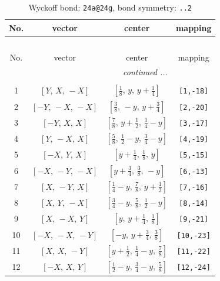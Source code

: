 \documentclass[fleqn,8pt]{jsarticle}
\begin{document}
\begin{longtable}{cccc}
\caption{Wyckoff bond: {\tt 24a@24g}, bond symmetry: {\tt ..2}}
 \\
 \hline \hline
No. & vector & center & mapping \\ \hline \endfirsthead

\multicolumn{3}{l}{\tablename\ \thetable{}} \\
 \hline \hline
No. & vector & center & mapping \\ \hline \endhead

 \hline \hline
\multicolumn{3}{r}{\footnotesize\it continued ...} \\ \endfoot

 \hline \hline
\multicolumn{3}{r}{} \\ \endlastfoot

1 & $\left[ Y,\, X,\, - X \right]$ & $\left[ \frac{1}{8},\, y,\, y + \frac{1}{4} \right]$ & {\tt [1,-18]} \\ \hline
2 & $\left[ - Y,\, - X,\, - X \right]$ & $\left[ \frac{3}{8},\, - y,\, y + \frac{3}{4} \right]$ & {\tt [2,-20]} \\ \hline
3 & $\left[ - Y,\, X,\, X \right]$ & $\left[ \frac{7}{8},\, y + \frac{1}{2},\, \frac{1}{4} - y \right]$ & {\tt [3,-17]} \\ \hline
4 & $\left[ Y,\, - X,\, X \right]$ & $\left[ \frac{5}{8},\, \frac{1}{2} - y,\, \frac{3}{4} - y \right]$ & {\tt [4,-19]} \\ \hline
5 & $\left[ - X,\, Y,\, X \right]$ & $\left[ y + \frac{1}{4},\, \frac{1}{8},\, y \right]$ & {\tt [5,-15]} \\ \hline
6 & $\left[ - X,\, - Y,\, - X \right]$ & $\left[ y + \frac{3}{4},\, \frac{3}{8},\, - y \right]$ & {\tt [6,-13]} \\ \hline
7 & $\left[ X,\, - Y,\, X \right]$ & $\left[ \frac{1}{4} - y,\, \frac{7}{8},\, y + \frac{1}{2} \right]$ & {\tt [7,-16]} \\ \hline
8 & $\left[ X,\, Y,\, - X \right]$ & $\left[ \frac{3}{4} - y,\, \frac{5}{8},\, \frac{1}{2} - y \right]$ & {\tt [8,-14]} \\ \hline
9 & $\left[ X,\, - X,\, Y \right]$ & $\left[ y,\, y + \frac{1}{4},\, \frac{1}{8} \right]$ & {\tt [9,-21]} \\ \hline
10 & $\left[ - X,\, - X,\, - Y \right]$ & $\left[ - y,\, y + \frac{3}{4},\, \frac{3}{8} \right]$ & {\tt [10,-23]} \\ \hline
11 & $\left[ X,\, X,\, - Y \right]$ & $\left[ y + \frac{1}{2},\, \frac{1}{4} - y,\, \frac{7}{8} \right]$ & {\tt [11,-22]} \\ \hline
12 & $\left[ - X,\, X,\, Y \right]$ & $\left[ \frac{1}{2} - y,\, \frac{3}{4} - y,\, \frac{5}{8} \right]$ & {\tt [12,-24]} \\
\end{longtable}
\end{document}
